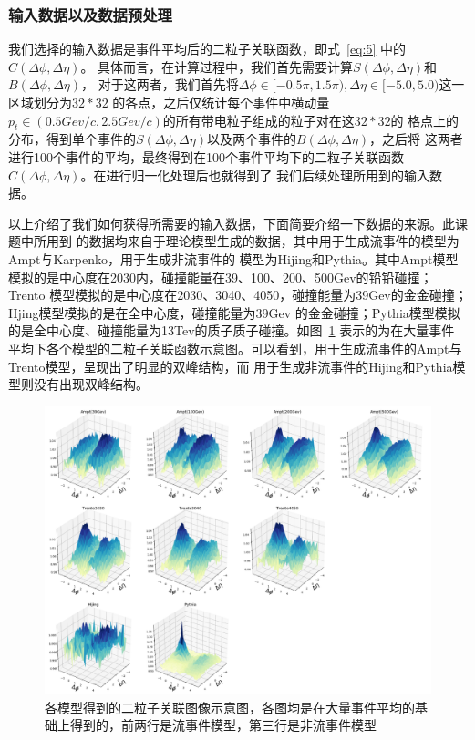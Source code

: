 \documentclass[aps,pre,12pt,preprint,onecolumn,showpacs,showkeys]{revtex4-1}
\begin{document}
\subsubsection{输入数据以及数据预处理}
我们选择的输入数据是事件平均后的二粒子关联函数，即式~\ref{eq:5} 中的$C(\Delta\phi,\Delta\eta)$。
具体而言，在计算过程中，我们首先需要计算$S(\Delta\phi,\Delta\eta)$和$B(\Delta\phi,\Delta\eta)$，
对于这两者，我们首先将$\Delta\phi\in[-0.5\pi,1.5\pi),\Delta\eta\in[-5.0,5.0)$这一区域划分为$32*32$
的各点，之后仅统计每个事件中横动量$p_{t}\in(0.5Gev/c,2.5Gev/c)$的所有带电粒子组成的粒子对在这$32*32$的
格点上的分布\cite{PhysRevC.89.064910}，得到单个事件的$S(\Delta\phi,\Delta\eta)$以及两个事件的$B(\Delta\phi,\Delta\eta)$，之后将
这两者进行100个事件的平均，最终得到在100个事件平均下的二粒子关联函数$C(\Delta\phi,\Delta\eta)$。在进行归一化处理后也就得到了
我们后续处理所用到的输入数据。\par
以上介绍了我们如何获得所需要的输入数据，下面简要介绍一下数据的来源。此课题中所用到
的数据均来自于理论模型生成的数据，其中用于生成流事件的模型为Ampt与Karpenko，用于生成非流事件的
模型为Hijing和Pythia。其中Ampt模型模拟\cite{PhysRevC.72.064901}的是中心度在2030内，碰撞能量在39、100、200、500Gev的铅铅碰撞；Trento
模型模拟的是中心度在2030、3040、4050，碰撞能量为39Gev的金金碰撞；Hjing模型\cite{PhysRevD.44.3501}模拟的是在全中心度，碰撞能量为39Gev
的金金碰撞；Pythia模型模拟的是全中心度、碰撞能量为13Tev的质子质子碰撞。如图~\ref{fig:sample} 表示的为在大量事件
平均下各个模型的二粒子关联函数示意图。可以看到，用于生成流事件的Ampt与Trento模型，呈现出了明显的双峰结构，而
用于生成非流事件的Hijing和Pythia模型则没有出现双峰结构。
\begin{figure}[htbp]
\centering
\includegraphics[width=140mm]{sample}
\caption{\label{fig:sample}%
各模型得到的二粒子关联图像示意图，各图均是在大量事件平均的基础上得到的，前两行是流事件模型，第三行是非流事件模型}
\end{figure}
\end{document}
